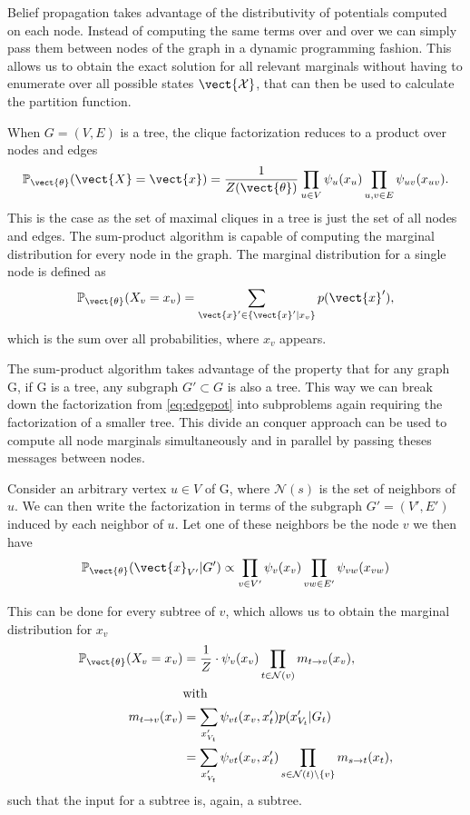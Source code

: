 Belief propagation takes advantage of the distributivity of potentials computed on each node. 
Instead of computing the same terms over and over we can simply pass them between nodes of the graph in a dynamic programming fashion.
This allows us to obtain the exact solution for all relevant marginals without having to enumerate over all possible states $\vect{\mathcal{X}}$, that can then be used to calculate the partition function.

When $G=(V,E)$ is a tree, the clique factorization reduces to a product over nodes and edges
\begin{equation}
    \label{eq:edgepot}
    \mathbb{P}_{\vect{\theta}}(\vect{X} = \vect{x}) = \frac{1}{Z(\vect{\theta})} \prod_{u\in V} \psi_u(x_u) \prod_{u,v \in E} \psi_{uv}(x_{uv}).
\end{equation}
This is the case as the set of maximal cliques in a tree is just the set of all nodes and edges.
The sum-product algorithm is capable of computing the marginal distribution for every node in the graph.
The marginal distribution for a single node is defined as
\begin{equation}
    \mathbb{P}_{\vect{\theta}}(X_v = x_v) = \sum_{\vect{x}' \in \{\vect{x}' \lvert x_v\}} p(\vect{x}'),
\end{equation}
which is the sum over all probabilities, where $x_v$ appears.

The sum-product algorithm takes advantage of the property that for any graph G, if G is a tree, any subgraph $G' \subset G$ is also a tree. 
This way we can break down the factorization from \eq\ref{eq:edgepot} into subproblems again requiring the factorization of a smaller tree.
This divide an conquer approach can be used to compute all node marginals simultaneously and in parallel by passing theses messages between nodes.


Consider an arbitrary vertex $u \in V$ of G, where $\mathcal{N}(s)$ is the set of neighbors of $u$.
We can then write the factorization in terms of the subgraph $G'=(V', E')$ induced by each neighbor of $u$. 
Let one of these neighbors be the node $v$ we then have 
\begin{equation}
    \mathbb{P}_{\vect{\theta}}(\vect{x}_{V'}\lvert G') \propto \prod_{v \in V'} \psi_v(x_v) \prod_{vw \in E'} \psi_{vw}(x_{vw})
\end{equation}

This can be done for every subtree of $v$, which allows us to obtain the marginal distribution for $x_v$
\begin{equation}
    \label{eq:normbp}
    \begin{split}
    \mathbb{P}_{\vect{\theta}}(X_v = x_v) &= \frac{1}{Z} \cdot \psi_v(x_v) \prod_{t \in \mathcal{N}(v)} m_{t \rightarrow v}(x_v),  \\
    & \text{with}\\
    m_{t \rightarrow v}(x_v) &= \sum_{x'_{V_t}} \psi_{vt}(x_v, x_t') p(x'_{V_t} \lvert G_t) \\
    & = \sum_{x'_{V_t}} \psi_{vt}(x_v, x_t')  \prod_{s\in \mathcal{N}(t) \setminus \{v\}} m_{s \rightarrow t}(x_t),
    \end{split}
\end{equation}
such that the input for a subtree is, again, a subtree.

